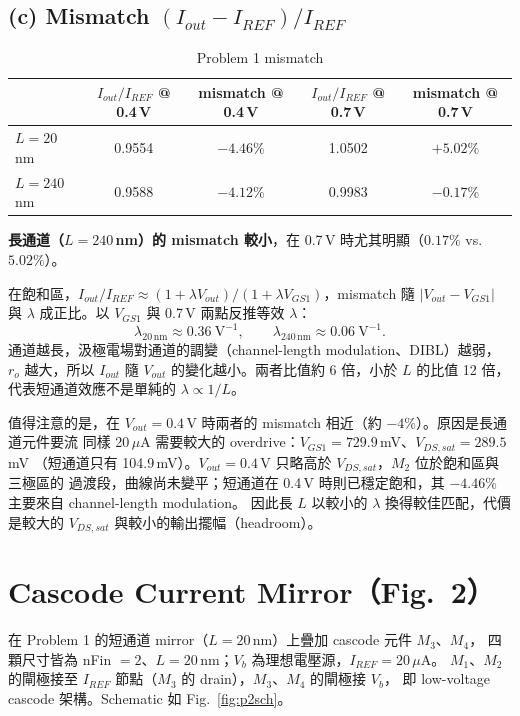 \documentclass[11pt,a4paper]{article}
\newcommand{\Iout}{I_{out}}
\newcommand{\Iref}{I_{REF}}
\newcommand{\Vout}{V_{out}}
\newcommand{\ratio}{\Iout/\Iref}
\begin{document}
\subsection*{(c) Mismatch $(\Iout-\Iref)/\Iref$}

\begin{table}[H]
  \centering
  \caption{Problem 1 mismatch}
  \label{tab:p1}
  \small
  \begin{tabular}{lcccc}
    \toprule
                & $\ratio$ @ 0.4\,V & mismatch @ 0.4\,V & $\ratio$ @ 0.7\,V & mismatch @ 0.7\,V \\
    \midrule
    $L=20$\,nm  & 0.9554            & $-4.46\%$         & 1.0502            & $+5.02\%$         \\
    $L=240$\,nm & 0.9588            & $-4.12\%$         & 0.9983            & $-0.17\%$         \\
    \bottomrule
  \end{tabular}
\end{table}

\textbf{長通道（$L=240$\,nm）的 mismatch 較小}，在 0.7\,V 時尤其明顯（$0.17\%$ vs.\ $5.02\%$）。

在飽和區，$\ratio \approx (1+\lambda\Vout)/(1+\lambda V_{GS1})$，mismatch 隨 $|\Vout-V_{GS1}|$
與 $\lambda$ 成正比。以 $V_{GS1}$ 與 0.7\,V 兩點反推等效 $\lambda$：
\[
  \lambda_{20\,\mathrm{nm}} \approx 0.36\ \mathrm{V^{-1}},\qquad
  \lambda_{240\,\mathrm{nm}} \approx 0.06\ \mathrm{V^{-1}}.
\]
通道越長，汲極電場對通道的調變（channel-length modulation、DIBL）越弱，
$r_o$ 越大，所以 $\Iout$ 隨 $\Vout$ 的變化越小。兩者比值約 6 倍，小於 $L$ 的比值 12 倍，
代表短通道效應不是單純的 $\lambda\propto 1/L$。

值得注意的是，在 $\Vout=0.4$\,V 時兩者的 mismatch 相近（約 $-4\%$）。原因是長通道元件要流
同樣 20\,$\mu$A 需要較大的 overdrive：$V_{GS1}=729.9$\,mV、$V_{DS,sat}=289.5$\,mV
（短通道只有 104.9\,mV）。$\Vout=0.4$\,V 只略高於 $V_{DS,sat}$，$M_2$ 位於飽和區與三極區的
過渡段，曲線尚未變平；短通道在 0.4\,V 時則已穩定飽和，其 $-4.46\%$ 主要來自 channel-length modulation。
因此長 $L$ 以較小的 $\lambda$ 換得較佳匹配，代價是較大的 $V_{DS,sat}$ 與較小的輸出擺幅（headroom）。

\section{Cascode Current Mirror（Fig.~2）}

在 Problem 1 的短通道 mirror（$L=20$\,nm）上疊加 cascode 元件 $M_{3}$、$M_{4}$，
四顆尺寸皆為 nFin $=2$、$L=20$\,nm；$V_b$ 為理想電壓源，$\Iref=20\,\mu$A。
$M_1$、$M_2$ 的閘極接至 $\Iref$ 節點（$M_3$ 的 drain），$M_3$、$M_4$ 的閘極接 $V_b$，
即 low-voltage cascode 架構。Schematic 如 Fig.~\ref{fig:p2sch}。
\end{document}
